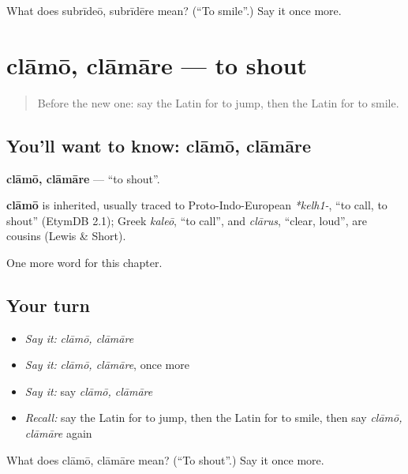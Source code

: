 \begin{tcolorbox}[breakable,colback=teal!4,colframe=teal!35!black,title={Before you move on}]
What does subrīdeō, subrīdēre mean? (\textquotedblleft{}To smile\textquotedblright{}.) Say it once more.
\end{tcolorbox}
\section[clāmō, clāmāre]{clāmō, clāmāre — to shout}

\label{lesson:LA-C165-clamo}



\begin{quote}
Before the new one: say the Latin for to jump, then the Latin for to smile.
\end{quote}

\subsection*{You'll want to know: clāmō, clāmāre}
\textbf{clāmō, clāmāre} — \textquotedblleft{}to shout\textquotedblright{}.

\begin{cousinweb}
\textbf{clāmō} is inherited, usually traced to Proto-Indo-European \emph{*kelh1-}, \textquotedblleft{}to call, to shout\textquotedblright{} (EtymDB 2.1); Greek \emph{kaleō}, \textquotedblleft{}to call\textquotedblright{}, and \emph{clārus}, \textquotedblleft{}clear, loud\textquotedblright{}, are cousins (Lewis \& Short).
\end{cousinweb}

\begin{grammarlens}[title={What you've built}]
One more word for this chapter.
\end{grammarlens}

\subsection*{Your turn}
\begin{itemize}
\raggedright
  \item \emph{Say it:} \emph{clāmō, clāmāre}
  \item \emph{Say it:} \emph{clāmō, clāmāre}, once more
  \item \emph{Say it:} say \emph{clāmō, clāmāre}
  \item \emph{Recall:} say the Latin for to jump, then the Latin for to smile, then say \emph{clāmō, clāmāre} again
\end{itemize}

\begin{tcolorbox}[breakable,colback=teal!4,colframe=teal!35!black,title={Before you move on}]
What does clāmō, clāmāre mean? (\textquotedblleft{}To shout\textquotedblright{}.) Say it once more.
\end{tcolorbox}
